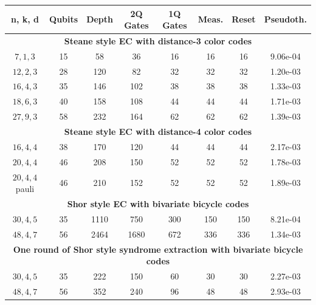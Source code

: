 \begin{tabular}{|c|c|c|c|c|c|c|c|}
\hline
n, k, d & Qubits & Depth & 2Q Gates & 1Q Gates & Meas. & Reset & Pseudoth. \\ \hline
\multicolumn{8}{|c|}{\textbf{Steane style EC with distance-3 color codes}} \\ \hline
$7,1,3$ & 15 & 58 & 36 & 16 & 16 & 16 & 9.06e-04 \\
\hline
$12,2,3$ & 28 & 120 & 82 & 32 & 32 & 32 & 1.20e-03 \\
\hline
$16,4,3$ & 35 & 146 & 102 & 38 & 38 & 38 & 1.33e-03 \\
\hline
$18,6,3$ & 40 & 158 & 108 & 44 & 44 & 44 & 1.71e-03 \\
\hline
$27,9,3$ & 58 & 232 & 164 & 62 & 62 & 62 & 1.39e-03 \\
\hline
\multicolumn{8}{|c|}{\textbf{Steane style EC with distance-4 color codes}} \\ \hline
$16,4,4$ & 38 & 170 & 120 & 44 & 44 & 44 & 2.17e-03 \\
\hline
$20,4,4$ & 46 & 208 & 150 & 52 & 52 & 52 & 1.78e-03 \\
\hline
$20,4,4$ pauli & 46 & 210 & 152 & 52 & 52 & 52 & 1.89e-03 \\
\hline
\multicolumn{8}{|c|}{\textbf{Shor style EC with bivariate bicycle codes}} \\ \hline
$30,4,5$ & 35 & 1110 & 750 & 300 & 150 & 150 & 8.21e-04 \\
\hline
$48,4,7$ & 56 & 2464 & 1680 & 672 & 336 & 336 & 1.34e-03 \\
\hline
\multicolumn{8}{|c|}{\textbf{One round of Shor style syndrome extraction with bivariate bicycle codes}} \\ \hline
$30,4,5$ & 35 & 222 & 150 & 60 & 30 & 30 & 2.27e-03 \\
\hline
$48,4,7$ & 56 & 352 & 240 & 96 & 48 & 48 & 2.93e-03 \\
\hline
\end{tabular}
